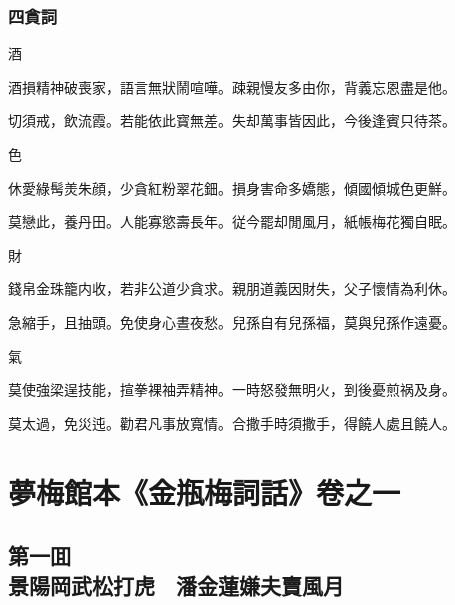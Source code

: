 \section*{四貪詞}

酒

\begin{myquote0}
酒損精神破喪家，語言無狀鬧喧嘩。疎親慢友多由你，背義忘恩盡是他。

切須戒，飲流霞。若能依此寳無差。失却萬事皆因此，今後逢賓只待茶。
\end{myquote0}

色

\begin{myquote0}
休愛綠髩羙朱顔，少貪紅粉翠花鈿。損身害命多嬌態，傾國傾城色更鮮。

莫戀此，養丹田。人能寡慾壽長年。従今罷却閒風月，紙帳梅花獨自眠。
\end{myquote0}

財

\begin{myquote0}
錢帛金珠籠内收，若非公道少貪求。親朋道義因財失，父子懷情為利休。

急縮手，且抽頭。免使身心晝夜愁。兒孫自有兒孫福，莫與兒孫作遠憂。
\end{myquote0}

氣

\begin{myquote0}
莫使強梁逞技能，揎拳裸袖弄精神。一時怒發無明火，到後憂煎祸及身。

莫太過，免災迍。勸君凡事放寬情。合撒手時須撒手，得饒人處且饒人。
\end{myquote0}

\part*{夢梅館本《金瓶梅詞話》卷之一}



\chapter*{第一囬　\\景陽岡武松打虎　潘金蓮嫌夫賣風月}
\thispagestyle{empty}

